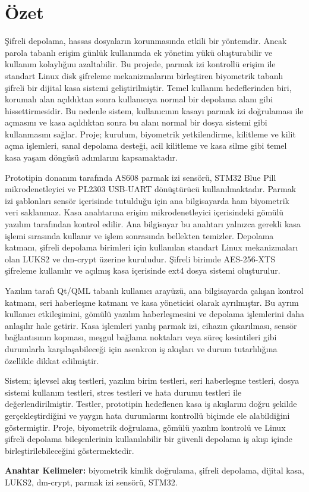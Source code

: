 \chapter*{Özet}

Şifreli depolama, hassas dosyaların korunmasında etkili bir yöntemdir. Ancak parola tabanlı erişim günlük kullanımda ek yönetim yükü oluşturabilir ve kullanım kolaylığını azaltabilir. Bu projede, parmak izi kontrollü erişim ile standart Linux disk şifreleme mekanizmalarını birleştiren biyometrik tabanlı şifreli bir dijital kasa sistemi geliştirilmiştir. Temel kullanım hedeflerinden biri, korumalı alan açıldıktan sonra kullanıcıya normal bir depolama alanı gibi hissettirmesidir. Bu nedenle sistem, kullanıcının kasayı parmak izi doğrulaması ile açmasını ve kasa açıldıktan sonra bu alanı normal bir dosya sistemi gibi kullanmasını sağlar. Proje; kurulum, biyometrik yetkilendirme, kilitleme ve kilit açma işlemleri, sanal depolama desteği, acil kilitleme ve kasa silme gibi temel kasa yaşam döngüsü adımlarını kapsamaktadır.

Prototipin donanım tarafında AS608 parmak izi sensörü, STM32 Blue Pill mikrodenetleyici ve PL2303 USB-UART dönüştürücü kullanılmaktadır. Parmak izi şablonları sensör içerisinde tutulduğu için ana bilgisayarda ham biyometrik veri saklanmaz. Kasa anahtarına erişim mikrodenetleyici içerisindeki gömülü yazılım tarafından kontrol edilir. Ana bilgisayar bu anahtarı yalnızca gerekli kasa işlemi sırasında kullanır ve işlem sonrasında bellekten temizler. Depolama katmanı, şifreli depolama birimleri için kullanılan standart Linux mekanizmaları olan LUKS2 ve dm-crypt üzerine kuruludur. Şifreli birimde AES-256-XTS şifreleme kullanılır ve açılmış kasa içerisinde ext4 dosya sistemi oluşturulur.

Yazılım tarafı Qt/QML tabanlı kullanıcı arayüzü, ana bilgisayarda çalışan kontrol katmanı, seri haberleşme katmanı ve kasa yöneticisi olarak ayrılmıştır. Bu ayrım kullanıcı etkileşimini, gömülü yazılım haberleşmesini ve depolama işlemlerini daha anlaşılır hale getirir. Kasa işlemleri yanlış parmak izi, cihazın çıkarılması, sensör bağlantısının kopması, meşgul bağlama noktaları veya süreç kesintileri gibi durumlarla karşılaşabileceği için asenkron iş akışları ve durum tutarlılığına özellikle dikkat edilmiştir.

Sistem; işlevsel akış testleri, yazılım birim testleri, seri haberleşme testleri, dosya sistemi kullanım testleri, stres testleri ve hata durumu testleri ile değerlendirilmiştir. Testler, prototipin hedeflenen kasa iş akışlarını doğru şekilde gerçekleştirdiğini ve yaygın hata durumlarını kontrollü biçimde ele alabildiğini göstermiştir. Proje, biyometrik doğrulama, gömülü yazılım kontrolü ve Linux şifreli depolama bileşenlerinin kullanılabilir bir güvenli depolama iş akışı içinde birleştirilebileceğini göstermektedir.

\vfill
\textbf{Anahtar Kelimeler:} biyometrik kimlik doğrulama, şifreli depolama, dijital kasa, LUKS2, dm-crypt, parmak izi sensörü, STM32.
\clearpage

